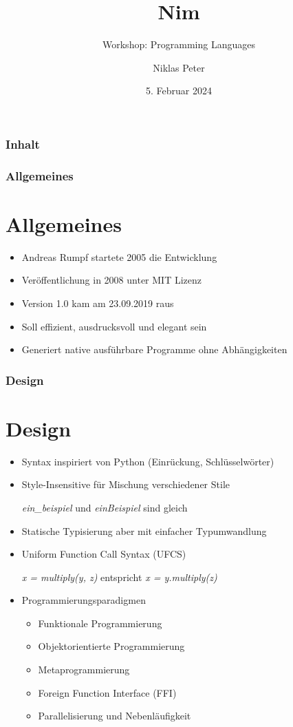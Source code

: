 \documentclass{beamer}
\title{Nim}
\subtitle{Workshop: Programming Languages}
\author{Niklas Peter}
\institute{Universität Siegen}
\date{5. Februar 2024}
\begin{document}
\begin{frame}
\titlepage
\end{frame}


\begin{frame}
\frametitle{Inhalt}
\tableofcontents
\end{frame}


\begin{frame}
\frametitle{Allgemeines}
\section{Allgemeines}
\begin{itemize}
	\item Andreas Rumpf startete 2005 die Entwicklung
	\item Veröffentlichung in 2008 unter MIT Lizenz
	\item Version 1.0 kam am 23.09.2019 raus
	\item Soll effizient, ausdrucksvoll und elegant sein
	\item Generiert native ausführbare Programme ohne Abhängigkeiten
\end{itemize}
\end{frame}


\begin{frame}
\frametitle{Design}
\section{Design}
\begin{itemize}
	\item Syntax inspiriert von Python (Einrückung, Schlüsselwörter)
	\item Style-Insensitive für Mischung verschiedener Stile
	
	\emph{ein\_beispiel} und \emph{einBeispiel} sind gleich
	\item Statische Typisierung aber mit einfacher Typumwandlung
	\item Uniform Function Call Syntax (UFCS)
	
	\emph{x = multiply(y, z)} entspricht \emph{x = y.multiply(z)}
	\item Programmierungsparadigmen
	\begin{itemize}
		\item Funktionale Programmierung
		\item Objektorientierte Programmierung
		\item Metaprogrammierung
		\item Foreign Function Interface (FFI)
		\item Parallelisierung und Nebenläufigkeit
	\end{itemize}
\end{itemize}
\end{frame}
\end{document}
